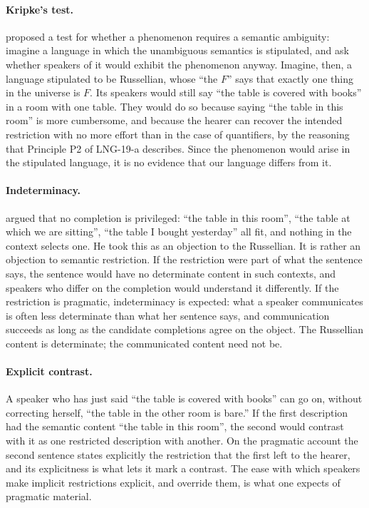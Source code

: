\documentclass{situationist-preprint}
\begin{document}
\paragraph{Kripke's test.} \citet{Kripke1977} proposed a test for whether a phenomenon requires a semantic ambiguity: imagine a language in which the unambiguous semantics is stipulated, and ask whether speakers of it would exhibit the phenomenon anyway. Imagine, then, a language stipulated to be Russellian, whose \enquote{the $F$} says that exactly one thing in the universe is $F$. Its speakers would still say \enquote{the table is covered with books} in a room with one table. They would do so because saying \enquote{the table in this room} is more cumbersome, and because the hearer can recover the intended restriction with no more effort than in the case of quantifiers, by the reasoning that Principle P2 of LNG-19-a describes. Since the phenomenon would arise in the stipulated language, it is no evidence that our language differs from it.

\paragraph{Indeterminacy.} \citet{Wettstein1981} argued that no completion is privileged: \enquote{the table in this room}, \enquote{the table at which we are sitting}, \enquote{the table I bought yesterday} all fit, and nothing in the context selects one. He took this as an objection to the Russellian. It is rather an objection to semantic restriction. If the restriction were part of what the sentence says, the sentence would have no determinate content in such contexts, and speakers who differ on the completion would understand it differently. If the restriction is pragmatic, indeterminacy is expected: what a speaker communicates is often less determinate than what her sentence says, and communication succeeds as long as the candidate completions agree on the object. The Russellian content is determinate; the communicated content need not be.

\paragraph{Explicit contrast.} A speaker who has just said \enquote{the table is covered with books} can go on, without correcting herself, \enquote{the table in the other room is bare.} If the first description had the semantic content \enquote{the table in this room}, the second would contrast with it as one restricted description with another. On the pragmatic account the second sentence states explicitly the restriction that the first left to the hearer, and its explicitness is what lets it mark a contrast. The ease with which speakers make implicit restrictions explicit, and override them, is what one expects of pragmatic material.
\end{document}
